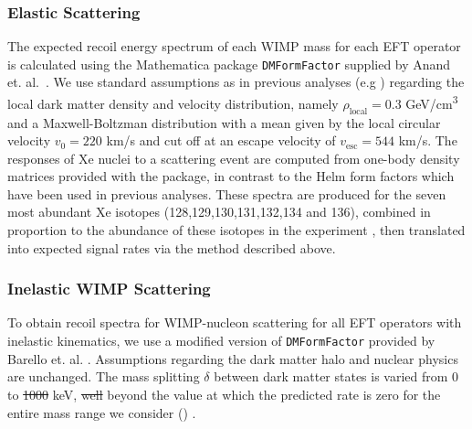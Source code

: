 %

\subsubsection{Elastic Scattering}
\label{subsubsec:Elastic}

The expected recoil energy spectrum of each WIMP mass for each EFT operator is calculated using the Mathematica package \texttt{DMFormFactor} supplied by Anand et. al.~\cite{Fitzpatrick:MathTools,Anand:MathTools}. We use standard assumptions as in previous analyses (e.g \cite{xe100_run_combination}) regarding the local dark matter density and velocity distribution, namely $\rho_\mathrm{local} = 0.3$ GeV/cm\textsuperscript{3} and a Maxwell-Boltzman distribution with a mean given by the local circular velocity $v_0 = 220$ km/s and cut off at an escape velocity of $v_\mathrm{esc} = 544$ km/s. The responses of Xe nuclei to a scattering event are computed from one-body density matrices provided with the package, in contrast to the Helm form factors which have been used in previous analyses. These spectra are produced for the seven most abundant Xe isotopes (128,129,130,131,132,134 and 136), combined in proportion to the abundance of these isotopes in the experiment \cite{xe100_run10_sd}, then translated into expected signal rates via the method described above.

\subsubsection{Inelastic WIMP Scattering}
\label{subsubsec:Inelastic}
To obtain recoil spectra for WIMP-nucleon scattering for all EFT operators with inelastic kinematics, we use a modified version of \texttt{DMFormFactor} provided by Barello et. al. \cite{InelasticMath}. Assumptions regarding the dark matter halo and nuclear physics are unchanged. The mass splitting $\delta$ between dark matter states is varied from 0 to \sout{1000}  keV, \sout{well} beyond the value at which the predicted rate is zero for the entire mass range we consider () .
